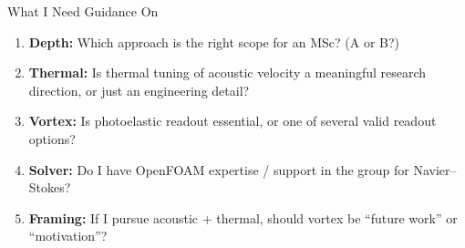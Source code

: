 \documentclass[aspectratio=169,11pt]{beamer}
\begin{document}
\begin{frame}{What I Need Guidance On}
  \begin{enumerate}
    \item \textbf{Depth:} Which approach is the right scope for an MSc? (A or B?)
    \item \textbf{Thermal:} Is thermal tuning of acoustic velocity a meaningful research direction, or just an engineering detail?
    \item \textbf{Vortex:} Is photoelastic readout essential, or one of several valid readout options?
    \item \textbf{Solver:} Do I have OpenFOAM expertise / support in the group for Navier--Stokes?
    \item \textbf{Framing:} If I pursue acoustic + thermal, should vortex be ``future work'' or ``motivation''?
  \end{enumerate}
\end{frame}
\end{document}
